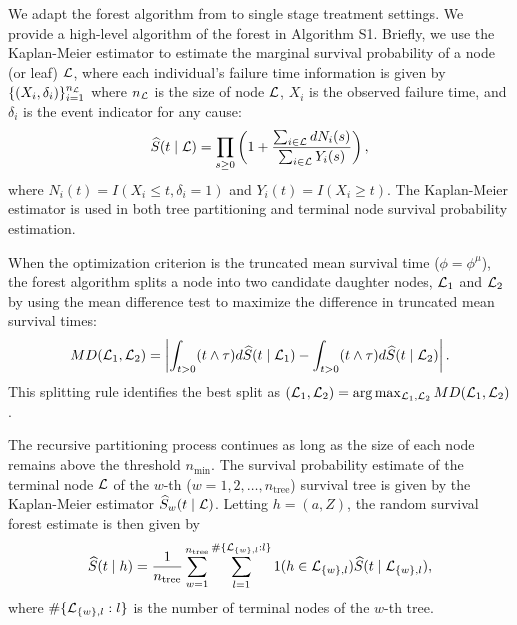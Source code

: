 %
%
We adapt the forest algorithm from \cite{cho_multi-stage_2023} to single stage treatment settings. We provide a high-level algorithm of the forest in Algorithm S1. Briefly, we use the Kaplan-Meier estimator to estimate the marginal survival probability of a node (or leaf) $\mathcal{L}$, where each individual’s failure time information is given by $\{(X_i, \delta_{i})\}^{n_{\mathcal{L}}}_{i=1}$ where \(n_{\mathcal{L}}\) is the size of node \(\mathcal{L}\), $X_i$ is the observed failure time, and $\delta_i$ is the event indicator for any cause: 
\begin{equation}
\label{eqn:KMest}
\widehat{S}(t\mid \mathcal{L}) = \prod_{s \geq 0} \left( 1 + \frac{\sum_{i \in \mathcal{L}} dN_{i}(s)}{\sum_{i \in \mathcal{L}} Y_{i}(s)} \right),
\end{equation}
where $N_i(t) = I(X_i \le t, \delta_i = 1)$ and $Y_i(t) = I(X_i \ge t)$.
The Kaplan-Meier estimator is used in both tree partitioning and terminal node survival probability estimation. 

When the optimization criterion is the truncated mean survival time (\( \phi = \phi^\mu \)), the forest algorithm splits a node into two candidate daughter nodes, \( \mathcal{L}_1 \) and \( \mathcal{L}_2 \) by using the mean difference test to maximize the difference in truncated mean survival times:
\begin{equation}
\label{eqn:MDtest}
MD(\mathcal{L}_1, \mathcal{L}_2) = \left| \int_{t > 0} (t \wedge \tau) d\widehat{S}(t \mid \mathcal{L}_1) - \int_{t > 0} (t \wedge \tau) d\widehat{S}(t \mid \mathcal{L}_2) \right|.
\end{equation}
This splitting rule identifies the best split as \( (\mathcal{L}_1, \mathcal{L}_2) = \arg \max_{\mathcal{L}_1,\mathcal{L}_2} MD(\mathcal{L}_1, \mathcal{L}_2) \). 

The recursive partitioning process continues as long as the size of each node remains above the threshold \( n_{\min} \). The survival probability estimate of the terminal node \( \mathcal{L} \) of the \( w \)-th (\( w = 1, 2, \ldots, n_{\text{tree}} \)) survival tree is given by the Kaplan-Meier estimator \( \widehat{S}_{w}(t \mid \mathcal{L}) \). Letting $h = (a,Z)$, the random survival forest estimate is then given by
\[
\widehat{S}(t \mid h) = \frac{1}{n_{\text{tree}}} \sum_{w=1}^{n_{\text{tree}}} \sum_{l=1}^{\#\{\mathcal{L}_{\{w\},l} : l\}} 1(h \in \mathcal{L}_{\{w\},l}) \widehat{S}(t \mid \mathcal{L}_{\{w\},l}),
\]
where \( \#\{\mathcal{L}_{\{w\},l} : l\} \) is the number of terminal nodes of the \( w \)-th tree.


%